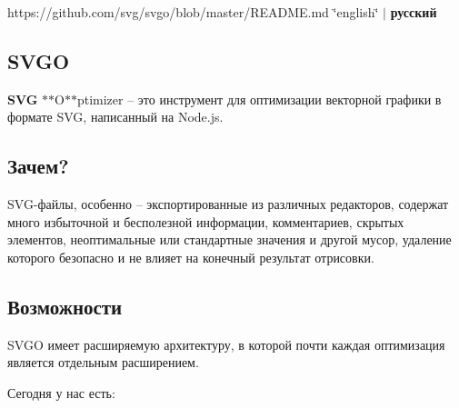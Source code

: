 https\+://github.com/svg/svgo/blob/master/\+R\+E\+A\+D\+M\+E.\+md \char`\"{}english\char`\"{} $\vert$ {\bfseries русский} 





\subsection*{S\+V\+GO \href{https://npmjs.org/package/svgo}{\tt } \href{https://gemnasium.com/svg/svgo}{\tt } \href{https://travis-ci.org/svg/svgo}{\tt } \href{https://coveralls.io/r/svg/svgo?branch=master}{\tt }}

{\bfseries S\+VG} $\ast$$\ast$\+O$\ast$$\ast$ptimizer – это инструмент для оптимизации векторной графики в формате S\+VG, написанный на Node.\+js. 

\subsection*{Зачем?}

S\+V\+G-\/файлы, особенно – экспортированные из различных редакторов, содержат много избыточной и бесполезной информации, комментариев, скрытых элементов, неоптимальные или стандартные значения и другой мусор, удаление которого безопасно и не влияет на конечный результат отрисовки.

\subsection*{Возможности}

S\+V\+GO имеет расширяемую архитектуру, в которой почти каждая оптимизация является отдельным расширением.

Сегодня у нас есть\+:

